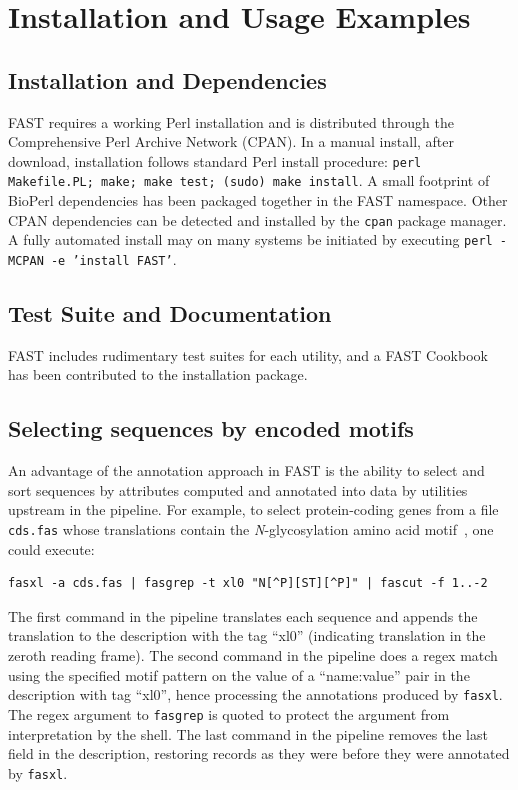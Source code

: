 \documentclass{frontiersSCNS} %
\begin{document}
\section{Installation and Usage Examples}

\subsection{Installation and Dependencies}
FAST requires a working Perl installation and is distributed through
the Comprehensive Perl Archive Network (CPAN). In a manual install,
after download, installation follows standard Perl install procedure:
{\tt perl Makefile.PL; make; make test; (sudo) make install}. A small
footprint of BioPerl dependencies has been packaged together in the
FAST namespace. Other CPAN dependencies can be detected and installed
by the {\tt cpan} package manager. A fully automated install may on
many systems be initiated by executing {\tt perl -MCPAN -e 'install
  FAST'}.

\subsection{Test Suite and Documentation}
FAST includes rudimentary test suites for each utility, and a FAST
Cookbook has been contributed to the installation package.

\subsection{Selecting sequences by encoded motifs }

An advantage of the annotation approach in FAST is the ability to
select and sort sequences by attributes computed and annotated into
data by utilities upstream in the pipeline. For example, to select
protein-coding genes from a file {\tt cds.fas} whose translations
contain the {\it N}-glycosylation amino acid
motif~\citep{KornfieldKornfield85}, one could execute:

\begin{verbatim}
fasxl -a cds.fas | fasgrep -t xl0 "N[^P][ST][^P]" | fascut -f 1..-2
\end{verbatim}
 
The first command in the pipeline translates each sequence and appends
the translation to the description with the tag ``xl0'' (indicating
translation in the zeroth reading frame). The second command in the
pipeline does a regex match using the specified motif pattern on the
value of a ``name:value'' pair in the description with tag ``xl0'',
hence processing the annotations produced by {\tt fasxl}. The regex
argument to {\tt fasgrep} is quoted to protect the argument from
interpretation by the shell. The last command in the pipeline removes
the last field in the description, restoring records as they were
before they were annotated by {\tt fasxl}.
\end{document}
